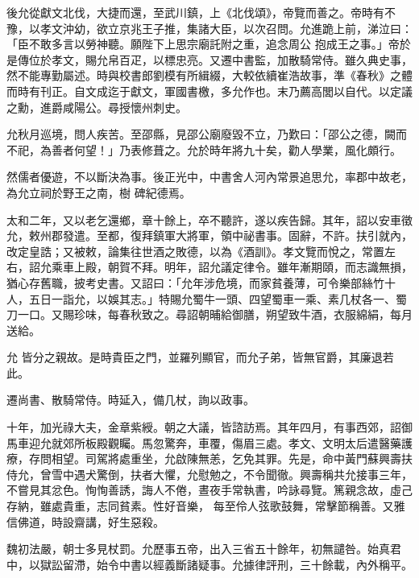 \begin{pinyinscope}
 後允從獻文北伐，大捷而還，至武川鎮，上《北伐頌》，帝覽而善之。帝時有不豫，以孝文沖幼，欲立京兆王子推，集諸大臣，以次召問。允進跪上前，涕泣曰：「臣不敢多言以勞神聽。願陛下上思宗廟託附之重，追念周公
 抱成王之事。」帝於是傳位於孝文，賜允帛百疋，以標忠亮。又遷中書監，加散騎常侍。雖久典史事，然不能專勤屬述。時與校書郎劉模有所緝綴，大較依續崔浩故事，準《春秋》之體而時有刊正。自文成迄于獻文，軍國書檄，多允作也。末乃薦高閭以自代。以定議之勳，進爵咸陽公。尋授懷州刺史。



 允秋月巡境，問人疾苦。至邵縣，見邵公廟廢毀不立，乃歎曰：「邵公之德，闕而不祀，為善者何望！」乃表修葺之。允於時年將九十矣，勸人學業，風化頗行。



 然儒者優遊，不以斷決為事。後正光中，中書舍人河內常景追思允，率郡中故老，為允立祠於野王之南，樹
 碑紀德焉。



 太和二年，又以老乞還鄉，章十餘上，卒不聽許，遂以疾告歸。其年，詔以安車徵允，敕州郡發遣。至都，復拜鎮軍大將軍，領中祕書事。固辭，不許。扶引就內，改定皇誥；又被敕，論集往世酒之敗德，以為《酒訓》。孝文覽而悅之，常置左右，詔允乘車上殿，朝賀不拜。明年，詔允議定律令。雖年漸期頤，而志識無損，猶心存舊職，披考史書。又詔曰：「允年涉危境，而家貧養薄，可令樂部絲竹十人，五日一詣允，以娛其志。」特賜允蜀牛一頭、四望蜀車一乘、素几杖各一、蜀刀一口。又賜珍味，每春秋致之。尋詔朝晡給御膳，朔望致牛酒，衣服綿絹，每月送給。



 允
 皆分之親故。是時貴臣之門，並羅列顯官，而允子弟，皆無官爵，其廉退若此。



 遷尚書、散騎常侍。時延入，備几杖，詢以政事。



 十年，加光祿大夫，金章紫綬。朝之大議，皆諮訪焉。其年四月，有事西郊，詔御馬車迎允就郊所板殿觀矚。馬忽驚奔，車覆，傷眉三處。孝文、文明太后遣醫藥護療，存問相望。司駕將處重坐，允啟陳無恙，乞免其罪。先是，命中黃門蘇興壽扶侍允，曾雪中遇犬驚倒，扶者大懼，允慰勉之，不令聞徹。興壽稱共允接事三年，不嘗見其忿色。恂恂善誘，誨人不倦，晝夜手常執書，吟詠尋覽。篤親念故，虛己存納，雖處貴重，志同貧素。性好音樂，
 每至伶人弦歌鼓舞，常擊節稱善。又雅信佛道，時設齋講，好生惡殺。



 魏初法嚴，朝士多見杖罰。允歷事五帝，出入三省五十餘年，初無譴咎。始真君中，以獄訟留滯，始令中書以經義斷諸疑事。允據律評刑，三十餘載，內外稱平。




\end{pinyinscope}
